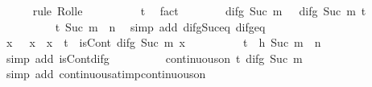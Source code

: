 \begin{isabellebody}
\ \ \ \ \isamarkupfalse%
\ {\isacharparenleft}{\kern0pt}rule\ Rolle{\isacharparenright}{\kern0pt}\isanewline
\ \ \ \ \ \ \isamarkupfalse%
\ {\isachardoublequoteopen}{}\ {\isacharless}{\kern0pt}\ t{\isachardoublequoteclose}\ \isamarkupfalse%
\ fact\isanewline
\ \ \ \ \ \ \isamarkupfalse%
\ {\isachardoublequoteopen}difg\ {\isacharparenleft}{\kern0pt}Suc\ m{\isacharprime}{\kern0pt}{\isacharparenright}{\kern0pt}\ {}\ {\isacharequal}{\kern0pt}\ difg\ {\isacharparenleft}{\kern0pt}Suc\ m{\isacharprime}{\kern0pt}{\isacharparenright}{\kern0pt}\ t{\isachardoublequoteclose}\isanewline
\ \ \ \ \ \ \ \ \isamarkupfalse%
\ t\ {\isacartoucheopen}Suc\ m{\isacharprime}{\kern0pt}\ {\isacharless}{\kern0pt}\ n{\isacartoucheclose}\ \isamarkupfalse%
\ {\isacharparenleft}{\kern0pt}simp\ add{\isacharcolon}{\kern0pt}\ difg{\isacharunderscore}{\kern0pt}Suc{\isacharunderscore}{\kern0pt}eq{\isacharunderscore}{\kern0pt}{}\ difg{\isacharunderscore}{\kern0pt}eq{\isacharunderscore}{\kern0pt}{}{\isacharparenright}{\kern0pt}\isanewline
\ \ \ \ \ \ \isamarkupfalse%
\ {\isachardoublequoteopen}{\isasymAnd}x{\isachardot}{\kern0pt}\ {}\ {\isasymle}\ x\ {\isasymand}\ x\ {\isasymle}\ t\ {\isasymLongrightarrow}\ isCont\ {\isacharparenleft}{\kern0pt}difg\ {\isacharparenleft}{\kern0pt}Suc\ m{\isacharprime}{\kern0pt}{\isacharparenright}{\kern0pt}{\isacharparenright}{\kern0pt}\ x{\isachardoublequoteclose}\isanewline
\ \ \ \ \ \ \ \ \isamarkupfalse%
\ {\isacartoucheopen}t\ {\isacharless}{\kern0pt}\ h{\isacartoucheclose}\ {\isacartoucheopen}Suc\ m{\isacharprime}{\kern0pt}\ {\isacharless}{\kern0pt}\ n{\isacartoucheclose}\ \isamarkupfalse%
\ {\isacharparenleft}{\kern0pt}simp\ add{\isacharcolon}{\kern0pt}\ isCont{\isacharunderscore}{\kern0pt}difg{\isacharparenright}{\kern0pt}\isanewline
\ \ \ \ \ \ \isamarkupfalse%
\ \isamarkupfalse%
\ {\isachardoublequoteopen}continuous{\isacharunderscore}{\kern0pt}on\ {\isacharbraceleft}{\kern0pt}{}{\isachardot}{\kern0pt}{\isachardot}{\kern0pt}t{\isacharbraceright}{\kern0pt}\ {\isacharparenleft}{\kern0pt}difg\ {\isacharparenleft}{\kern0pt}Suc\ m{\isacharprime}{\kern0pt}{\isacharparenright}{\kern0pt}{\isacharparenright}{\kern0pt}{\isachardoublequoteclose}\isanewline
\ \ \ \ \ \ \ \ \isamarkupfalse%
\ {\isacharparenleft}{\kern0pt}simp\ add{\isacharcolon}{\kern0pt}\ continuous{\isacharunderscore}{\kern0pt}at{\isacharunderscore}{\kern0pt}imp{\isacharunderscore}{\kern0pt}continuous{\isacharunderscore}{\kern0pt}on{\isacharparenright}{\kern0pt}\isanewline

\end{isabellebody}
